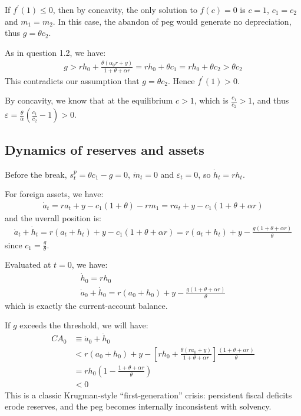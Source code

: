 \documentclass[a4paper,12pt]{article} %
\theoremstyle{nonitalic}
\begin{document}
If $f^{\prime} (1) \leq 0$, then by concavity, the only solution to $f(c) = 0$ is $c=1$,
$c_1 = c_2$ and $m_1 = m_2$. In this case, the abandon of peg would generate no depreciation,
thus $g = \theta c_2$.

As in question 1.2, we have:
\begin{gather*}
    g > r h_0 + \frac{\theta (\alpha_0 r + y)}{1 + \theta + \alpha r} = r h_0 + \theta c_1 = r h_0 + \theta c_2 > \theta c_2
\end{gather*}
This contradicts our assumption that $g =  \theta c_2.$
Hence $f^{\prime} (1) > 0$.

By concavity, we know that at the equilibrium $c > 1$, which is $\frac{c_1}{c_2} > 1$,
and thus $\varepsilon = \frac{\theta}{\alpha}\left(\frac{c_1}{c_2} - 1\right) > 0$.


\subsection{Dynamics of reserves and assets}\label{sec:1.4}
Before the break, $s_t^p = \theta c_1 - g = 0$, $\dot{m}_t = 0$ and $\varepsilon_t = 0$, so $\dot{h}_t = r h_t$.

For foreign assets, we have:
\begin{gather*}
    \dot{a}_t = r a_t + y - c_1(1+\theta) - r m_1 = r a_t + y - c_1 (1 + \theta + \alpha r)
\end{gather*}
and the uverall position is:
\begin{gather*}
    \dot{a}_t + \dot{h}_t = r(a_t + h_t) + y - c_1(1 + \theta + \alpha r) = r(a_t + h_t) + y - \frac{g (1 + \theta + \alpha r)}{\theta}
\end{gather*}
since $c_1 = \frac{g}{\theta}$.

Evaluated at $t=0$, we have:
\begin{gather*}
    \dot{h}_0 = r h_ 0 \\
    \dot{a}_0 + \dot{h}_0 = r (a_0 + h_0) + y - \frac{g (1 + \theta + \alpha r)}{\theta}
\end{gather*}
which is exactly the current-account balance. 

If $g$ exceeds the threshold, we will have:
\begin{align*}
    CA_0 & \equiv \dot{a}_0 + \dot{h}_0 \\
    &< r(a_0 + h_0) + y -  \left[ r h_0 + \frac{\theta (r a_0 + y)}{1 + \theta + \alpha r} \right] \frac{(1 + \theta + \alpha r)}{\theta} \\
    &= r h_0 \left(1 - \frac{1 + \theta + \alpha r}{\theta}\right) \\
    &< 0
\end{align*}
This is a classic Krugman-style ``first-generation'' crisis: persistent fiscal deficits erode reserves,
and the peg becomes internally inconsistent with solvency.
\end{document}
